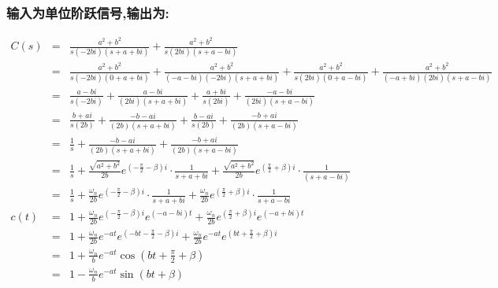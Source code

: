 \documentclass{article}
\begin{document}
\begin{frame}
\frametitle{输入为单位阶跃信号,输出为:}
\label{sec-2-1-3}

\begin{eqnarray*}
C(s) &=& \frac{a^2+b^2}{s(-2bi)(s+a+bi)}+\frac{a^2+b^2}{s(2bi)(s+a-bi)}\\
     &=& \frac{a^2+b^2}{s(-2bi)(0+a+bi)}+\frac{a^2+b^2}{(-a-bi)(-2bi)(s+a+bi)}+\frac{a^2+b^2}{s(2bi)(0+a-bi)}+\frac{a^2+b^2}{(-a+bi)(2bi)(s+a-bi)}\\
     &=& \frac{a-bi}{s(-2bi)}+\frac{a-bi}{(2bi)(s+a+bi)}+\frac{a+bi}{s(2bi)}+\frac{-a-bi}{(2bi)(s+a-bi)}\\
     &=& \frac{b+ai}{s(2b)}+\frac{-b-ai}{(2b)(s+a+bi)}+\frac{b-ai}{s(2b)}+\frac{-b+ai}{(2b)(s+a-bi)}\\
     &=& \frac{1}{s}+\frac{-b-ai}{(2b)(s+a+bi)}+\frac{-b+ai}{(2b)(s+a-bi)}\\
     &=& \frac{1}{s}+\frac{\sqrt{a^2+b^2}}{2b}e^{(-\frac{\pi}{2}-\beta)i}\cdot\frac{1}{s+a+bi}+\frac{\sqrt{a^2+b^2}}{2b}e^{(\frac{\pi}{2}+\beta)i}\cdot\frac{1}{(s+a-bi)}\\
     &=& \frac{1}{s}+\frac{\omega_n}{2b}e^{(-\frac{\pi}{2}-\beta)i}\cdot\frac{1}{s+a+bi}+\frac{\omega_n}{2b}e^{(\frac{\pi}{2}+\beta)i}\cdot\frac{1}{s+a-bi}\\
c(t) &=& 1+\frac{\omega_n}{2b}e^{(-\frac{\pi}{2}-\beta)i}e^{(-a-bi)t}+\frac{\omega_n}{2b}e^{(\frac{\pi}{2}+\beta)i}e^{(-a+bi)t}\\
     &=& 1+\frac{\omega_n}{2b}e^{-at} e^{(-bt-\frac{\pi}{2}-\beta)i}+\frac{\omega_n}{2b}e^{-at}e^{(bt+\frac{\pi}{2}+\beta)i}\\
     &=& 1+\frac{\omega_n}{b}e^{-at} \cos(bt+\frac{\pi}{2}+\beta)\\
     &=& 1-\frac{\omega_n}{b}e^{-at} \sin(bt+\beta)\\
\end{eqnarray*}
\end{frame}
\end{document}
